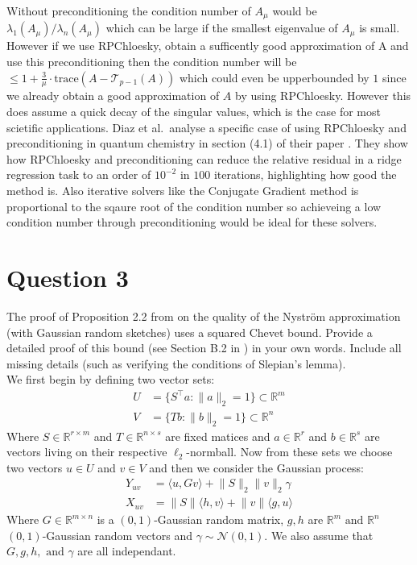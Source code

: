 Without preconditioning the condition number of $A_{\mu}$ would be $\lambda_1(A_{\mu}) / \lambda_n(A_{\mu})$ which can
be large if the smallest eigenvalue of $A_{\mu}$ is small. However if we use RPChloesky, obtain a sufficently good
approximation of A and use this preconditioning then the condition number will be $\leq 1 +
\frac{3}{\mu}\cdot\text{trace}(A - \mathcal{T}_{p-1}(A))$ which could even be upperbounded by $1$ since we already
obtain a good approximation of $A$ by using RPChloesky. However this does assume a quick decay of the singular values,
which is the case for most scietific applications. Diaz et al.\ analyse a specific case of using RPChloesky and
preconditioning in quantum chemistry in section (4.1) of their paper \cite{diaz2024}. They show how RPChloesky and preconditioning can reduce the
relative residual in a ridge regression task to an order of $10^{-2}$ in $100$ iterations, highlighting how good the
method is. Also iterative solvers like the Conjugate Gradient method is proportional to the sqaure root of the condition
number so achieveing a low condition number through preconditioning would be ideal for these solvers.

\section{Question 3}
The proof of Proposition 2.2 from \cite{frangella2021randomizednystrompreconditioning} on the quality of the Nyström
approximation (with Gaussian random sketches) uses a squared Chevet bound. Provide a detailed proof of this bound (see
Section B.2 in \cite{frangella2021randomizednystrompreconditioning}) in your own words. Include all missing details
(such as verifying the conditions of Slepian’s lemma). \\

We first begin by defining two vector sets:
\begin{align*}
    U &= \{ S^{\top}a : \lVert a \rVert_2 = 1 \} \subset \mathbb{R}^m \\
    V &= \{ Tb : \lVert b \rVert_2 = 1\} \subset \mathbb{R}^n 
\end{align*}
Where $S \in \mathbb{R}^{r \times m}$ and $T \in \mathbb{R}^{n \times s}$ are fixed matices and $a \in \mathbb{R}^{r}$
and $b \in \mathbb{R}^{s}$ are vectors living on their respective $\ell_2$-normball. Now from these sets we choose two
vectors $u \in U$ and $v \in V$ and then we consider the Gaussian process:
\begin{align*}
    Y_{uv} &= \langle u, Gv \rangle + \lVert S \rVert_2 \lVert v \rVert_2 \gamma \\
    X_{uv} &= \lVert S \rVert \langle h, v \rangle + \lVert v \rVert \langle g, u \rangle
\end{align*}
Where $G \in \mathbb{R}^{m \times n}$ is a $(0, 1)$-Gaussian random matrix, $g, h$ are $\mathbb{R}^{m} \text{ and }
\mathbb{R}^{n}$ $(0, 1)$-Gaussian random vectors and $\gamma \sim \mathcal{N}(0, 1)$. We also assume that $G, g, h,
\text{ and } \gamma$ are all independant. \\

